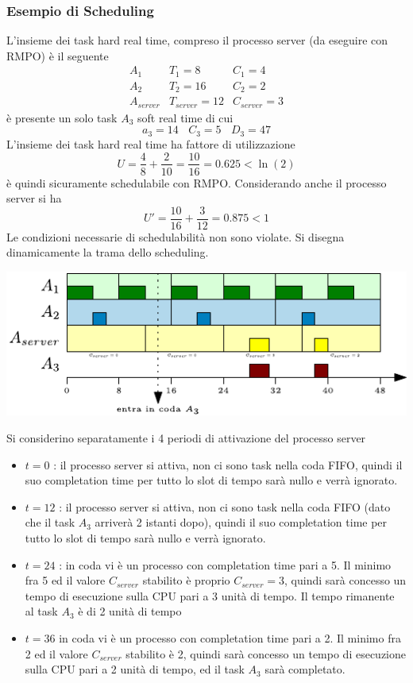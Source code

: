 \documentclass[10pt, letterpaper]{report}
\begin{document}
\subsubsection{Esempio di Scheduling}
L'insieme dei task hard real time, compreso il processo server  (da eseguire con RMPO) è il seguente 
$$ \begin{matrix}
A_1 & T_1 = 8 & C_1 = 4 \\ 
A_2 & T_2 = 16 & C_2 = 2 \\ 
A_{server} & T_{server}=12 & C_{server} = 3\end{matrix}
$$
è presente un solo task $A_3$ soft real time di cui 
$$ a_3=14 \ \ \ \ C_3 = 5 \ \ \ \ D_3 = 47$$
L'insieme dei task hard real time ha fattore di utilizzazione 
$$ U=\frac{4}{8}+\frac{2}{10}=\frac{10}{16}=0.625<\ln(2)$$
è quindi sicuramente schedulabile con RMPO. Considerando anche il processo server si ha 
$$ U' = \frac{10}{16}+\frac{3}{12}=0.875<1$$
Le condizioni necessarie di schedulabilità non sono violate. Si disegna dinamicamente la trama dello scheduling.\begin{center}
    \includegraphics[width=1\textwidth ]{images/esempioPollingServer.pdf}
\end{center}
Si considerino separatamente i 4 periodi di attivazione del processo server\begin{itemize}
    \item $t=0$ : il processo server si attiva, non ci sono task nella coda FIFO, quindi il suo completation time per tutto lo slot di tempo sarà nullo e verrà ignorato.
    \item $t=12$ : il processo server si attiva, non ci sono task nella coda FIFO (dato che il task $A_3$ arriverà 2 istanti dopo), quindi il suo completation time per tutto lo slot di tempo sarà nullo e verrà ignorato.
    \item $t=24$ : in coda vi è un processo con completation time pari a 5. Il minimo fra 5 ed il valore $C_{server}$ stabilito è proprio $C_{server}=3$, quindi sarà concesso un tempo di esecuzione sulla CPU pari a 3 unità di tempo. Il tempo rimanente al task $A_3$  è di 2 unità di tempo 
    \item $t=36$  in coda vi è un processo con completation time pari a 2. Il minimo fra 2 ed il valore $C_{server}$ stabilito è 2, quindi sarà concesso un tempo di esecuzione sulla CPU pari a 2 unità di tempo, ed il task $A_3$ sarà completato.
\end{itemize}
\end{document}
